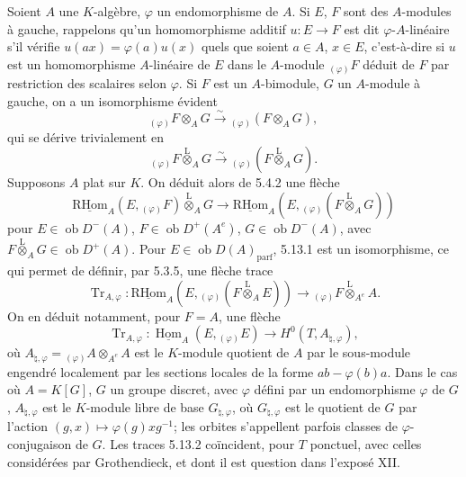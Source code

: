\documentclass[11pt]{article}
\DeclareMathOperator{\Hom}{Hom}
\newcommand{\ob}{\operatorname{ob}}
\providecommand{\RHom}{\mathrm{RHom}}
\providecommand{\uRHom}{\underline{\RHom}}
\providecommand{\uHom}{\underline{\Hom}}
\providecommand{\Tr}{\operatorname{Tr}}
\providecommand{\Tr}{\operatorname{Tr}}
\providecommand{\lten}{\overset{\mathrm L}{\otimes}}
\providecommand{\Tr}{\operatorname{Tr}}
\providecommand{\RHom}{\mathrm{RHom}}
\providecommand{\Hom}{\operatorname{Hom}}
\providecommand{\ob}{\operatorname{ob}}
\providecommand{\lten}{\overset{\mathrm L}{\otimes}}
\providecommand{\RHom}{\mathrm R\mathcal{H}om}
\providecommand{\lten}{\overset{\mathrm L}{\otimes}}
\providecommand{\Tr}{\operatorname{Tr}}
\providecommand{\lten}{\overset{\mathrm L}{\otimes}}
\providecommand{\lten}{\overset{\mathrm L}{\otimes}}
\providecommand{\lten}{\overset{\mathrm L}{\otimes}}
\providecommand{\RHom}{\mathrm{RHom}}
\providecommand{\Hom}{\operatorname{Hom}}
\providecommand{\Tr}{\operatorname{Tr}}
\providecommand{\lten}{\overset{\mathrm L}{\otimes}}
\begin{document}
Soient $A$ une $K$-algèbre, $\varphi$ un endomorphisme de $A$. Si $E$, $F$ sont des $A$-modules à gauche, rappelons qu'un homomorphisme additif $u:E\to F$ est dit $\varphi$-$A$-linéaire s'il vérifie $u(ax)=\varphi(a)u(x)$ quels que soient $a\in A$, $x\in E$, c'est-à-dire si $u$ est un homomorphisme $A$-linéaire de $E$ dans le $A$-module ${}_{(\varphi)}F$ déduit de $F$ par restriction des scalaires selon $\varphi$. Si $F$ est un $A$-bimodule, $G$ un $A$-module à gauche, on a un isomorphisme évident
\[
{}_{(\varphi)}F\otimes_AG\xrightarrow{\sim}{}_{(\varphi)}(F\otimes_AG),
\]
qui se dérive trivialement en
\[
{}_{(\varphi)}F\lten_AG\xrightarrow{\sim}{}_{(\varphi)}(F\lten_AG).
\]
Supposons $A$ plat sur $K$. On déduit alors de 5.4.2 une flèche
\begin{equation}\tag{5.13.1}
\uRHom_A(E,{}_{(\varphi)}F)\lten_AG\longrightarrow\uRHom_A(E,{}_{(\varphi)}(F\lten_AG))
\end{equation}
pour $E\in\ob D^-(A)$, $F\in\ob D^+(A^e)$, $G\in\ob D^-(A)$, avec $F\lten_AG\in\ob D^+(A)$. Pour $E\in\ob D(A)_{\mathrm{parf}}$, 5.13.1 est un isomorphisme, ce qui permet de définir, par 5.3.5, une flèche trace
\begin{equation}\tag{5.13.2}
\Tr_{A,\varphi}:\uRHom_A(E,{}_{(\varphi)}(F\lten_AE))\longrightarrow {}_{(\varphi)}F\lten_{A^e}A.
\end{equation}
On en déduit notamment, pour $F=A$, une flèche
\begin{equation}\tag{5.13.3}
\Tr_{A,\varphi}:\uHom_A(E,{}_{(\varphi)}E)\longrightarrow H^0(T,A_{\natural,\varphi}),
\end{equation}
où $A_{\natural,\varphi}={}_{(\varphi)}A\otimes_{A^e}A$ est le $K$-module quotient de $A$ par le sous-module engendré localement par les sections locales de la forme $ab-\varphi(b)a$. Dans le cas où $A=K[G]$, $G$ un groupe discret, avec $\varphi$ défini par un endomorphisme $\varphi$ de $G$, $A_{\natural,\varphi}$ est le $K$-module libre de base $G_{\natural,\varphi}$, où $G_{\natural,\varphi}$ est le quotient de $G$ par l'action $(g,x)\mapsto\varphi(g)xg^{-1}$; les orbites s'appellent parfois classes de $\varphi$-conjugaison de $G$. Les traces 5.13.2 coïncident, pour $T$ ponctuel, avec celles considérées par Grothendieck, et dont il est question dans l'exposé XII.
\end{document}
